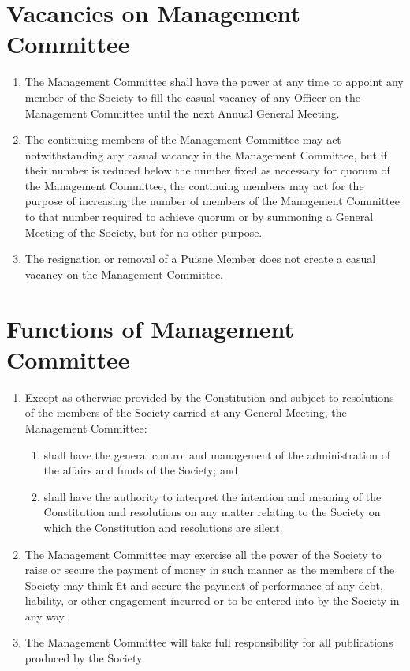 \documentclass[a4paper]{article}
\newcommand*{\sectionr}[1]{{\raggedright \section{#1}}}
\begin{document}
\sectionr{Vacancies on Management Committee}
\begin{enumerate}
\item The Management Committee shall have the power at any time to appoint any member of the Society to fill the casual vacancy of any Officer on the Management Committee until the next Annual General Meeting.
\item The continuing members of the Management Committee may act notwithstanding any casual vacancy in the Management Committee, but if their number is reduced below the number fixed as necessary for quorum of the Management Committee, the continuing members may act for the purpose of increasing the number of members of the Management Committee to that number required to achieve quorum or by summoning a General Meeting of the Society, but for no other purpose.
\item The resignation or removal of a Puisne Member does not create a casual vacancy on the Management Committee.
\end{enumerate}

\sectionr{Functions of Management Committee}
\begin{enumerate}
\item Except as otherwise provided by the Constitution and subject to resolutions of the members of the Society carried at any General Meeting, the Management Committee:
	\begin{enumerate}
	\item shall have the general control and management of the administration of the affairs and funds of the Society; and
	\item shall have the authority to interpret the intention and meaning of the Constitution and resolutions on any matter relating to the Society on which the Constitution and resolutions are silent.
	\end{enumerate}
\item The Management Committee may exercise all the power of the Society to raise or secure the payment of money in such manner as the members of the Society may think fit and secure the payment of performance of any debt, liability, or other engagement incurred or to be entered into by the Society in any way.
\item The Management Committee will take full responsibility for all publications produced by the Society.
\end{enumerate}
\end{document}
